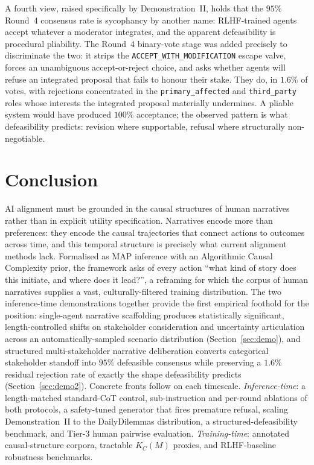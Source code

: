 \documentclass{article}
\theoremstyle{plain}
\theoremstyle{definition}
\theoremstyle{remark}
\begin{document}
A fourth view, raised specifically by Demonstration~II, holds that the $95\%$ Round~4 consensus rate is sycophancy by another name: RLHF-trained agents accept whatever a moderator integrates, and the apparent defeasibility is procedural pliability. The Round~4 binary-vote stage was added precisely to discriminate the two: it strips the \texttt{ACCEPT\_WITH\_MODIFICATION} escape valve, forces an unambiguous accept-or-reject choice, and asks whether agents will refuse an integrated proposal that fails to honour their stake. They do, in $1.6\%$ of votes, with rejections concentrated in the \texttt{primary\_affected} and \texttt{third\_party} roles whose interests the integrated proposal materially undermines. A pliable system would have produced $100\%$ acceptance; the observed pattern is what defeasibility predicts: revision where supportable, refusal where structurally non-negotiable.

\section{Conclusion}

AI alignment must be grounded in the causal structures of human narratives rather than in explicit utility specification. Narratives encode more than preferences: they encode the causal trajectories that connect actions to outcomes across time, and this temporal structure is precisely what current alignment methods lack. Formalised as MAP inference with an Algorithmic Causal Complexity prior, the framework asks of every action ``what kind of story does this initiate, and where does it lead?'', a reframing for which the corpus of human narratives supplies a vast, culturally-filtered training distribution. The two inference-time demonstrations together provide the first empirical foothold for the position: single-agent narrative scaffolding produces statistically significant, length-controlled shifts on stakeholder consideration and uncertainty articulation across an automatically-sampled scenario distribution (Section~\ref{sec:demo}), and structured multi-stakeholder narrative deliberation converts categorical stakeholder standoff into $95\%$ defeasible consensus while preserving a $1.6\%$ residual rejection rate of exactly the shape defeasibility predicts (Section~\ref{sec:demo2}). Concrete fronts follow on each timescale. \emph{Inference-time}: a length-matched standard-CoT control, sub-instruction and per-round ablations of both protocols, a safety-tuned generator that fires premature refusal, scaling Demonstration~II to the DailyDilemmas distribution, a structured-defeasibility benchmark, and Tier-3 human pairwise evaluation. \emph{Training-time}: annotated causal-structure corpora, tractable $K_C(M)$ proxies, and RLHF-baseline robustness benchmarks.



\end{document}
